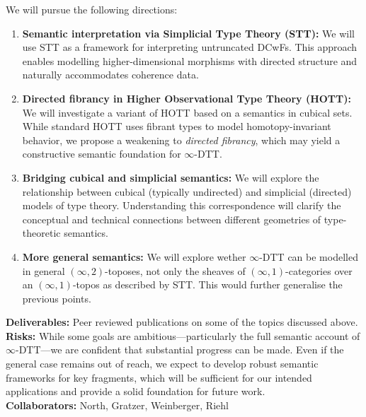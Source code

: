\documentclass[a4paper,11pt]{article}
\renewcommand{\paragraph}[1]{\textbf{#1.}}
\begin{document}
We will pursue the following directions:

\begin{enumerate}
\item \textbf{Semantic interpretation via Simplicial Type Theory
    (STT):} We will use STT as a framework for interpreting
  untruncated DCwFs. This approach enables modelling
  higher-dimensional morphisms with directed structure and naturally
  accommodates coherence data. 

\item \textbf{Directed fibrancy in Higher Observational Type Theory
    (HOTT):} We will investigate a variant of HOTT based on a
  semantics in cubical sets. While standard HOTT uses fibrant types to
  model homotopy-invariant behavior, we propose a weakening to
  \emph{directed fibrancy}, which may yield a constructive semantic
  foundation for $\infty$-DTT. 

\item \textbf{Bridging cubical and simplicial semantics:} We will
  explore the relationship between cubical (typically undirected) and
  simplicial (directed) models of type theory. Understanding this
  correspondence will clarify the conceptual and technical connections
  between different geometries of type-theoretic semantics.

\item \textbf{More general semantics:} We will explore wether
  $\infty$-DTT can be modelled in general $(\infty,2)$-toposes, not only
  the sheaves of $(\infty,1)$-categories over an $(\infty,1)$-topos as
  described by STT. This
  would further generalise the previous points.
\end{enumerate}

\textbf{Deliverables:} Peer reviewed publications on some of the
topics discussed above. \\
\textbf{Risks:} While some goals are ambitious—particularly the full
semantic account of $\infty$-DTT—we are confident that substantial
progress can be made. Even if the general case remains out of reach,
we expect to develop robust semantic frameworks for key fragments,
which will be sufficient for our intended applications and provide a
solid foundation for future work.\\
\textbf{Collaborators:} North, Gratzer, Weinberger, Riehl

\end{document}
